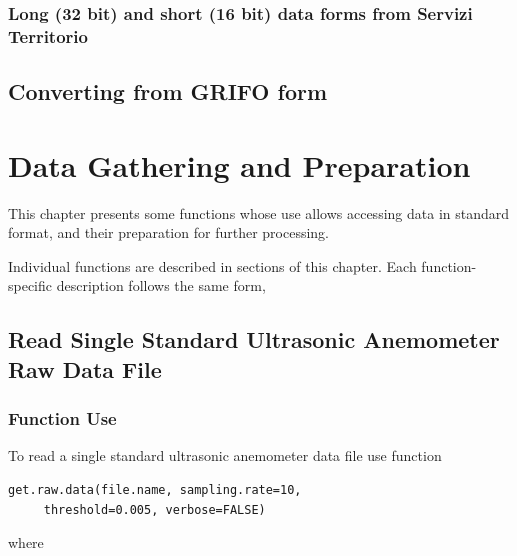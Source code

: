 \documentclass[a4paper,10pt]{book}
\begin{document}
\subsection{Long (32 bit) and short (16 bit) data forms from Servizi Territorio}


\section{Converting from GRIFO form}
\label{sec:Convert GRIFO}


\chapter{Data Gathering and Preparation}
\label{chap:Data Gathering}

This chapter presents some functions whose use allows accessing data in standard format, and their preparation for further processing.

Individual functions are described in sections of this chapter. Each function-specific description follows the same form, 

\section{Read Single Standard Ultrasonic Anemometer Raw Data File}
\label{sec:Get Raw Data File}

\subsection{Function Use}

To read a single standard ultrasonic anemometer data file use function

\begin{verbatim}
get.raw.data(file.name, sampling.rate=10,
     threshold=0.005, verbose=FALSE)
\end{verbatim}

\noindent where
\end{document}
